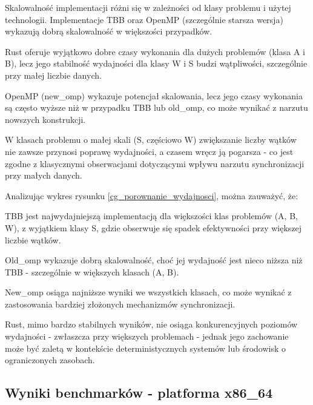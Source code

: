 Skalowalność implementacji różni się w zależności od klasy problemu i użytej technologii. Implementacje TBB oraz OpenMP (szczególnie starsza wersja) wykazują dobrą skalowalność w większości przypadków.

Rust oferuje wyjątkowo dobre czasy wykonania dla dużych problemów (klasa A i B), lecz jego stabilność wydajności dla klasy W i S budzi wątpliwości, szczególnie przy małej liczbie danych.

OpenMP (new\_omp) wykazuje potencjał skalowania, lecz jego czasy wykonania są często wyższe niż w przypadku TBB lub old\_omp, co może wynikać z narzutu nowszych konstrukcji.

W klasach problemu o małej skali (S, częściowo W) zwiększanie liczby wątków nie zawsze przynosi poprawę wydajności, a czasem wręcz ją pogarsza - co jest zgodne z klasycznymi obserwacjami dotyczącymi wpływu narzutu synchronizacji przy małych danych.

Analizując wykres rysunku \ref{cg_porownanie_wydajnosci}, można zauważyć, że:

TBB jest najwydajniejszą implementacją dla większości klas problemów (A, B, W), z wyjątkiem klasy S, gdzie obserwuje się spadek efektywności przy większej liczbie wątków.

Old\_omp wykazuje dobrą skalowalność, choć jej wydajność jest nieco niższa niż TBB - szczególnie w większych klasach (A, B).

New\_omp osiąga najniższe wyniki we wszystkich klasach, co może wynikać z zastosowania bardziej złożonych mechanizmów synchronizacji.

Rust, mimo bardzo stabilnych wyników, nie osiąga konkurencyjnych poziomów wydajności - zwłaszcza przy większych problemach - jednak jego zachowanie może być zaletą w kontekście deterministycznych systemów lub środowisk o ograniczonych zasobach.


\subsection{Wyniki benchmarków - platforma x86\_64}
